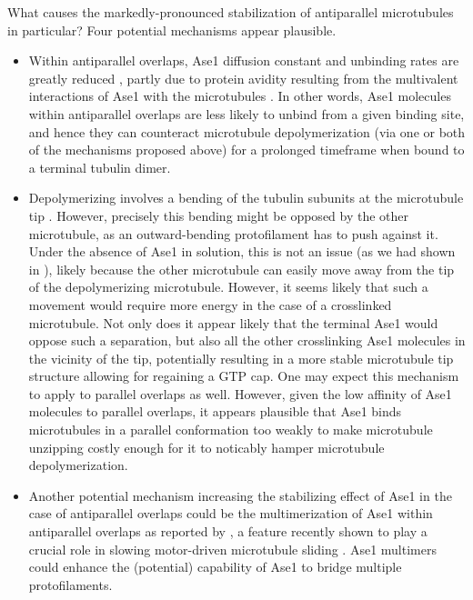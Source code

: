 \par
What causes the markedly-pronounced stabilization of antiparallel microtubules in particular? Four potential mechanisms appear plausible.

\begin{itemize}
    \item Within antiparallel overlaps, Ase1 diffusion constant and unbinding rates are greatly reduced \parencite{Kapitein2008, lanskydiffusible2015}, partly due to protein avidity resulting from the multivalent interactions of Ase1 with the microtubules \parencite{braun2020cytoskeletal, erlendsson2021binding}. In other words, Ase1 molecules within antiparallel overlaps are less likely to unbind from a given binding site, and hence they can counteract microtubule depolymerization (via one or both of the mechanisms proposed above) for a prolonged timeframe when bound to a terminal tubulin dimer.
    \item Depolymerizing involves a bending of the tubulin subunits at the microtubule tip . However, precisely this bending might be opposed by the other microtubule, as an outward-bending protofilament has to push against it. Under the absence of Ase1 in solution, this is not an issue (as we had shown in ), likely because the other microtubule can easily move away from the tip of the depolymerizing microtubule. However, it seems likely that such a movement would require more energy in the case of a crosslinked microtubule. Not only does it appear likely that the terminal Ase1 would oppose such a separation, but also all the other crosslinking Ase1 molecules in the vicinity of the tip, potentially resulting in a more stable microtubule tip structure allowing for regaining a GTP cap. One may expect this mechanism to apply to parallel overlaps as well. However, given the low affinity of Ase1 molecules to parallel overlaps, it appears plausible that Ase1 binds microtubules in a parallel conformation too weakly to make microtubule unzipping costly enough for it to noticably hamper microtubule depolymerization.
    \item Another potential mechanism increasing the stabilizing effect of Ase1 in the case of antiparallel overlaps could be the multimerization of Ase1 within antiparallel overlaps as reported by \cite{Kapitein2008}, a feature recently shown to play a crucial role in slowing motor-driven microtubule sliding \parencite{alfieri2021two}. Ase1 multimers could enhance the (potential) capability of Ase1 to bridge multiple protofilaments.

\end{itemize}
